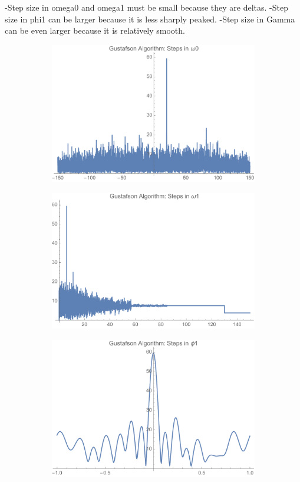 \documentclass[onecolumn, groupedaddress, 10pt]{revtex4-1}
\begin{document}
-Step size in omega0 and omega1 must be small because they are deltas.
-Step size in phi1 can be larger because it is less sharply peaked.
-Step size in Gamma can be even larger because it is relatively smooth.
\begin{figure}[H]
	\centering	
	\begin{subfigure}{.5\textwidth}
  		\centering
  		\includegraphics[width=.9\linewidth]{gustafsonAlgoStepInCarrier.pdf}
  		\caption{}
	\end{subfigure}%
	\begin{subfigure}{.5\textwidth}
  		\centering
  		\includegraphics[width=.9\linewidth]{gustafsonAlgoStepInModFreq.pdf}
  		\caption{}
	\end{subfigure}
	\begin{subfigure}{.5\textwidth}
  		\centering
  		\includegraphics[width=.9\linewidth]{gustafsonAlgoStepInPhi1.pdf}

\end{subfigure}
\end{figure}
\end{document}
